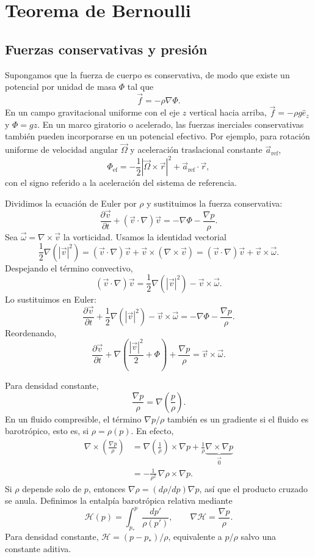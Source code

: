 \section{Teorema de Bernoulli}

\subsection{Fuerzas conservativas y presión}

Supongamos que la fuerza de cuerpo es conservativa, de modo que existe un potencial por unidad de masa $\Phi$ tal que
\[
\vec f=-\rho\nabla\Phi.
\]
En un campo gravitacional uniforme con el eje $z$ vertical hacia arriba, $\vec f=-\rho g\hat e_z$ y $\Phi=gz$. En un marco giratorio o acelerado, las fuerzas inerciales conservativas también pueden incorporarse en un potencial efectivo. Por ejemplo, para rotación uniforme de velocidad angular $\vec\Omega$ y aceleración traslacional constante $\vec a_{\mathrm{ref}}$,
\[
\Phi_{\mathrm{ef}}
=-\frac12|\vec\Omega\times\vec r|^2
+\vec a_{\mathrm{ref}}\cdot\vec r,
\]
con el signo referido a la aceleración del sistema de referencia.

Dividimos la ecuación de Euler por $\rho$ y sustituimos la fuerza conservativa:
\[
\frac{\partial\vec v}{\partial t}
+(\vec v\cdot\nabla)\vec v
=-\nabla\Phi-\frac{\nabla p}{\rho}.
\]
Sea $\vec\omega=\nabla\times\vec v$ la vorticidad. Usamos la identidad vectorial
\[
\frac12\nabla(|\vec v|^2)
=(\vec v\cdot\nabla)\vec v
+\vec v\times(\nabla\times\vec v)
=(\vec v\cdot\nabla)\vec v+\vec v\times\vec\omega.
\]
Despejando el término convectivo,
\[
(\vec v\cdot\nabla)\vec v
=\frac12\nabla(|\vec v|^2)-\vec v\times\vec\omega.
\]
Lo sustituimos en Euler:
\[
\frac{\partial\vec v}{\partial t}
+\frac12\nabla(|\vec v|^2)
-\vec v\times\vec\omega
=-\nabla\Phi-\frac{\nabla p}{\rho}.
\]
Reordenando,
\[
\frac{\partial\vec v}{\partial t}
+\nabla\left(\frac{|\vec v|^2}{2}+\Phi\right)
+\frac{\nabla p}{\rho}
=\vec v\times\vec\omega.
\]

Para densidad constante,
\[
\frac{\nabla p}{\rho}=\nabla\left(\frac{p}{\rho}\right).
\]
En un fluido compresible, el término $\nabla p/\rho$ también es un gradiente si el fluido es barotrópico, esto es, si $\rho=\rho(p)$. En efecto,
\[
\begin{aligned}
\nabla\times\left(\frac{\nabla p}{\rho}\right)
&=\nabla\left(\frac{1}{\rho}\right)\times\nabla p
+\frac{1}{\rho}\underbrace{\nabla\times\nabla p}_{\vec 0}\\
&=-\frac{1}{\rho^2}\,\nabla\rho\times\nabla p.
\end{aligned}
\]
Si $\rho$ depende solo de $p$, entonces $\nabla\rho=(d\rho/dp)\nabla p$, así que el producto cruzado se anula. Definimos la entalpía barotrópica relativa mediante
\[
\mathcal H(p)=\int_{p_*}^{p}\frac{dp'}{\rho(p')},
\qquad
\nabla\mathcal H=\frac{\nabla p}{\rho}.
\]
Para densidad constante, $\mathcal H=(p-p_*)/\rho$, equivalente a $p/\rho$ salvo una constante aditiva.

